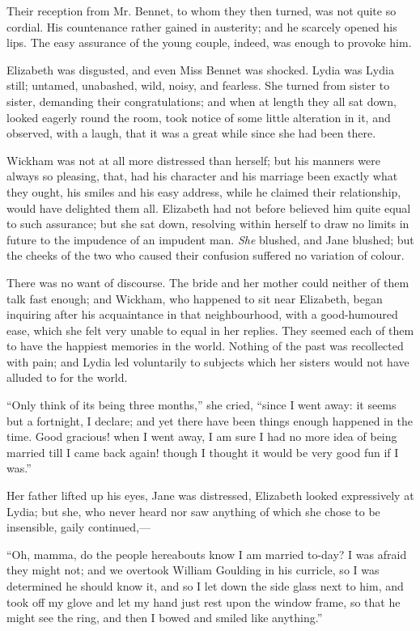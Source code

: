 \documentclass[12pt]{book}
\begin{document}
Their reception from Mr. Bennet, to whom they then turned, was not quite so cordial. His countenance rather gained in austerity; and he scarcely opened his lips. The easy assurance of the young couple, indeed, was enough to provoke him.

Elizabeth was disgusted, and even Miss Bennet was shocked. Lydia was Lydia still; untamed, unabashed, wild, noisy, and fearless. She turned from sister to sister, demanding their congratulations; and when at length they all sat down, looked eagerly round the room, took notice of some little alteration in it, and observed, with a laugh, that it was a great while since she had been there.

Wickham was not at all more distressed than herself; but his manners were always so pleasing, that, had his character and his marriage been exactly what they ought, his smiles and his easy address, while he claimed their relationship, would have delighted them all. Elizabeth had not before believed him quite equal to such assurance; but she sat down, resolving within herself to draw no limits in future to the impudence of an impudent man. \textit{She} blushed, and Jane blushed; but the cheeks of the two who caused their confusion suffered no variation of colour.

There was no want of discourse. The bride and her mother could neither of them talk fast enough; and Wickham, who happened to sit near Elizabeth, began inquiring after his acquaintance in that neighbourhood, with a good-humoured ease, which she felt very unable to equal in her replies. They seemed each of them to have the happiest memories in the world. Nothing of the past was recollected with pain; and Lydia led voluntarily to subjects which her sisters would not have alluded to for the world.

``Only think of its being three months,'' she cried, ``since I went away: it seems but a fortnight, I declare; and yet there have been things enough happened in the time. Good gracious! when I went away, I am sure I had no more idea of being married till I came back again! though I thought it would be very good fun if I was.''

Her father lifted up his eyes, Jane was distressed, Elizabeth looked expressively at Lydia; but she, who never heard nor saw anything of which she chose to be insensible, gaily continued,---

``Oh, mamma, do the people hereabouts know I am married to-day? I was afraid they might not; and we overtook William Goulding in his curricle, so I was determined he should know it, and so I let down the side glass next to him, and took off my glove and let my hand just rest upon the window frame, so that he might see the ring, and then I bowed and smiled like anything.''
\end{document}
